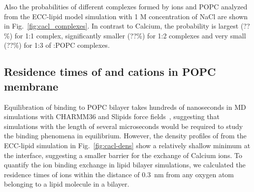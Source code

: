\documentclass[aip,jcp,twocolumn]{revtex4}
\begin{document}
Also the probabilities of different complexes formed by  ions and POPC
analyzed from the ECC-lipid model simulation with 1 M concentration of NaCl are
shown in Fig.~\ref{fig:cacl_complexes}. In contrast to Calcium, the
probability is largest (??\%) for 1:1 complex, significantly smaller (??\%)
for 1:2 complexes and very small (??\%) for 1:3 of :POPC complexes.




\subsection{Residence times of  and  cations in POPC membrane}

Equilibration of  binding to POPC bilayer takes hundreds of
nanoseconds in MD simulations with CHARMM36 and Slipids force fields~\cite{javanainen17}, suggesting that
simulations with the length of several microseconds would be required
to study the binding phenomena in equilibrium. However, the density profiles of 
from the ECC-lipid simulation in Fig.~\ref{fig:cacl-dens} show a relatively shallow
minimum at the interface, suggesting a smaller barrier for the exchange of Calcium ions.
To quantify the ion binding exchange in lipid bilayer simulations, we calculated 
the residence times of ions within the distance of 0.3~nm from any oxygen atom
belonging to a lipid molecule in a bilayer.
\end{document}
